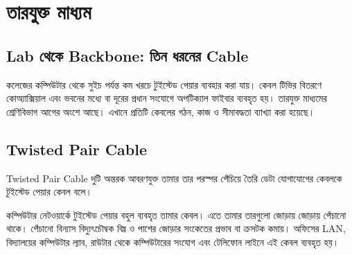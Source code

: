\begingroup
\chTwoReadableTopicStyle
\section{তারযুক্ত মাধ্যম}

\subsection{Lab থেকে Backbone: তিন ধরনের Cable}
কলেজের কম্পিউটার থেকে সুইচ পর্যন্ত কম খরচে টুইস্টেড পেয়ার ব্যবহার করা যায়। কেবল টিভির বিতরণে কোঅ্যাক্সিয়াল এবং ভবনের মধ্যে বা দূরের প্রধান সংযোগে অপটিক্যাল ফাইবার ব্যবহৃত হয়। তারযুক্ত মাধ্যমের শ্রেণিবিভাগ আগের অংশে আছে। এখানে প্রতিটি কেবলের গঠন, কাজ ও সীমাবদ্ধতা ব্যাখ্যা করা হয়েছে।
\subsection{Twisted Pair Cable}

\begin{definitionbox}{Twisted Pair Cable}
দুটি অন্তরক আবরণযুক্ত তামার তার পরস্পর পেঁচিয়ে তৈরি ডেটা যোগাযোগের কেবলকে টুইস্টেড পেয়ার কেবল বলে।
\end{definitionbox}

কম্পিউটার নেটওয়ার্কে টুইস্টেড পেয়ার বহুল ব্যবহৃত তামার কেবল। এতে তামার তারগুলো জোড়ায় জোড়ায় পেঁচানো থাকে। পেঁচানো বিন্যাস বিদ্যুৎচৌম্বক বিঘ্ন ও পাশের জোড়ার সংকেতের প্রভাব বা ক্রসটক কমায়। অফিসের LAN, বিদ্যালয়ের কম্পিউটার ল্যাব, রাউটার থেকে কম্পিউটারের সংযোগ এবং টেলিফোন লাইনে এই কেবল ব্যবহৃত হয়।




